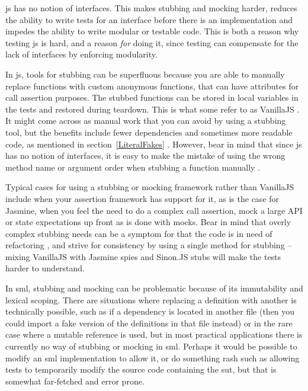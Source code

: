\documentclass[11pt]{article}
\begin{document}
\Gls{js} has no notion of interfaces. This makes stubbing and mocking harder, reduces the ability to write tests for an interface before there is an implementation and impedes the ability to write modular or testable code. This is both a reason why testing \gls{js} is hard, and a reason \emph{for} doing it, since testing can compensate for the lack of interfaces by enforcing modularity.

In \gls{js}, tools for stubbing can be superfluous because you are able to manually replace functions with custom anonymous functions, that can have attributes for call assertion purposes. The stubbed functions can be stored in local variables in the tests and restored during teardown. This is what some refer to as VanillaJS \cite[question~53]{Edelstam}. It might come across as manual work that you can avoid by using a stubbing tool, but the benefits include fewer dependencies and sometimes more readable code, as mentioned in section~\ref{LiteralFakes} \cite[questions~54-55]{Edelstam}. However, bear in mind that since \gls{js} has no notion of interfaces, it is easy to make the mistake of using the wrong method name or argument order when stubbing a function manually \cite[p.~471]{Tddjs}.

Typical cases for using a stubbing or mocking framework rather than VanillaJS include when your assertion framework has support for it, as is the case for Jasmine, when you feel the need to do a complex call assertion, mock a large API or state expectations up front as is done with mocks. Bear in mind that overly complex stubbing needs can be a symptom for that the code is in need of refactoring \cite[question~34]{Stenmark}, and strive for consistency by using a single method for stubbing -- mixing VanillaJS with Jasmine spies and Sinon.JS stubs will make the tests harder to understand.

In \gls{sml}, stubbing and mocking can be problematic because of its immutability and lexical scoping. There are situations where replacing a definition with another is technically possible, such as if a dependency is located in another file (then you could import a fake version of the definitions in that file instead) or in the rare case where a mutable reference is used, but in most practical applications there is currently no way of stubbing or mocking in \gls{sml}. Perhaps it would be possible to modify an \gls{sml} implementation to allow it, or do something rash such as allowing tests to temporarily modify the source code containing the \gls{sut}, but that is somewhat far-fetched and error prone.
\end{document}
